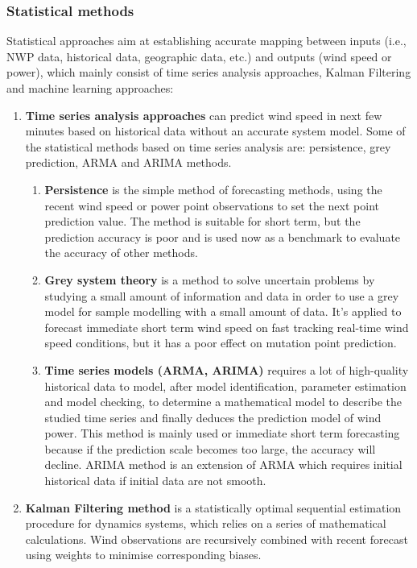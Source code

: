 \subsubsection{Statistical methods}

Statistical approaches aim at establishing accurate mapping between inputs (i.e., NWP data, historical data, geographic data, etc.) and outputs (wind speed or power), which mainly consist of time series analysis approaches, Kalman Filtering and machine learning approaches:

\begin{enumerate}

    \item \textbf{Time series analysis approaches} can predict wind speed in next few minutes based on historical data without an accurate system model. Some of the statistical methods based on time series analysis are: persistence, grey prediction, ARMA and ARIMA methods. 
    \begin{enumerate}
        \item \textbf{Persistence} is the simple method of forecasting methods, using the recent wind speed or power point observations to set the next point prediction value. The method is suitable for short term, but the prediction accuracy is poor and is used now as a benchmark to evaluate the accuracy of other methods.
        \item \textbf{Grey system theory} is a method to solve uncertain problems by studying a small amount of information and data in order to use a grey model for sample modelling with a small amount of data. It's applied to forecast immediate short term wind speed on fast tracking real-time wind speed conditions, but it has a poor effect on mutation point prediction.
        \item \textbf{Time series models (ARMA, ARIMA)} requires a lot of high-quality historical data to model, after model identification, parameter estimation and model checking, to determine a mathematical model to describe the studied time series and finally deduces the prediction model of wind power. This method is mainly used or immediate short term forecasting because if the prediction scale becomes too large, the accuracy will decline. ARIMA method is an extension of ARMA which requires initial historical data if initial data are not smooth.
    \end{enumerate}
    
    \item \textbf{Kalman Filtering method} is a statistically optimal sequential estimation procedure for dynamics systems, which relies on a series of mathematical calculations. Wind observations are recursively combined with recent forecast using weights to minimise corresponding biases.
    

\end{enumerate}

